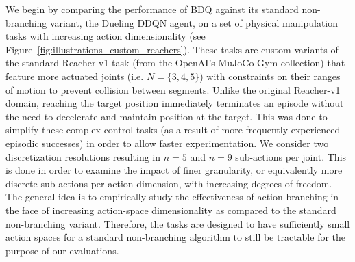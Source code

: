 \documentclass[letterpaper]{article} %
\begin{document}
We begin by comparing the performance of BDQ against its standard non-branching variant, the Dueling DDQN agent, on a set of physical manipulation tasks with increasing action dimensionality (see Figure~\ref{fig:illustrations_custom_reachers}). These tasks are custom variants of the standard Reacher-v1 task (from the OpenAI's MuJoCo Gym collection) that feature more actuated joints (i.e. $N = \{3,4,5\}$) with constraints on their ranges of motion to prevent collision between segments. Unlike the original Reacher-v1 domain, reaching the target position immediately terminates an episode without the need to decelerate and maintain position at the target. This was done to simplify these complex control tasks (as a result of more frequently experienced episodic successes) in order to allow faster experimentation. We consider two discretization resolutions resulting in $n=5$ and $n=9$ sub-actions per joint. This is done in order to examine the impact of finer granularity, or equivalently more discrete sub-actions per action dimension, with increasing degrees of freedom. The general idea is to empirically study the effectiveness of action branching in the face of increasing action-space dimensionality as compared to the standard non-branching variant. Therefore, the tasks are designed to have sufficiently small action spaces for a standard non-branching algorithm to still be tractable for the purpose of our evaluations.
\end{document}
